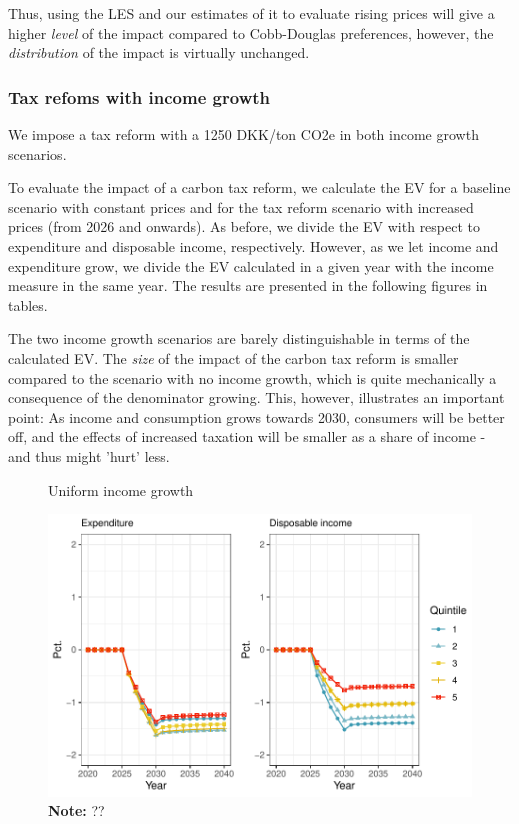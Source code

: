 Thus, using the LES and our estimates of it to evaluate rising prices will give a higher \textit{level} of the impact compared to Cobb-Douglas preferences, however, the \textit{distribution} of the impact is virtually unchanged. 


\subsubsection{Tax refoms with income growth}
We impose a tax reform with a 1250 DKK/ton CO2e in both income growth scenarios.  

To evaluate the impact of a carbon tax reform, we calculate the EV for a baseline scenario with constant prices and for the tax reform scenario with increased prices (from 2026 and onwards). As before, we divide the EV with respect to expenditure and disposable income, respectively. However, as we let income and expenditure grow, we divide the EV calculated in a given year with the income measure in the same year. The results are presented in the following figures in tables. 

The two income growth scenarios are barely distinguishable in terms of the calculated EV. The \textit{size} of the impact of the carbon tax reform is smaller compared to the scenario with no income growth, which is quite mechanically a consequence of the denominator growing. This, however, illustrates an important point: As income and consumption grows towards 2030, consumers will be better off, and the effects of increased taxation will be smaller as a share of income - and thus might 'hurt' less. 

\begin{figure}[H]
\centering
\caption{Uniform income growth}
\label{fig:uniincgr}
\includegraphics[width=.7\textwidth]{Figures/timeEV_1250_indfas_unifincgrowth.pdf}
\captionsetup{singlelinecheck=off,size=scriptsize}
\setlength{\captionmargin}{10pt}
\caption*{
\textbf{Note:} ??\\}
\end{figure}

